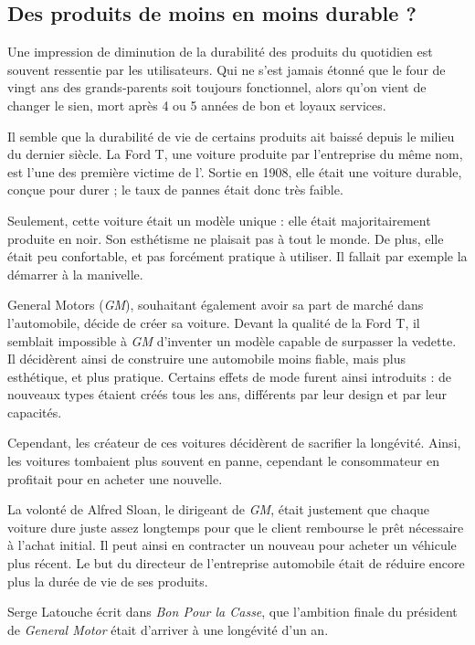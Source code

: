 \subsection{Des produits de moins en moins durable ?}

Une impression de diminution de la durabilité des produits du quotidien est souvent ressentie par les utilisateurs. Qui ne s'est jamais étonné que le four de vingt ans des grands-parents soit toujours fonctionnel, alors qu'on vient de changer le sien, mort après 4 ou 5 années de bon et loyaux services. 

Il semble que la durabilité de vie de certains produits ait baissé depuis le milieu du dernier siècle. 
\smallbreak
La Ford T, une voiture produite par l'entreprise du même nom, est l'une des première victime de l'\op. Sortie en 1908, elle était une voiture durable, conçue pour durer ; le taux de pannes était donc très faible.   


Seulement, cette voiture était un modèle unique : elle était majoritairement produite en noir. Son esthétisme ne plaisait pas à tout le monde. De plus, elle était peu confortable, et pas forcément pratique à utiliser. Il fallait par exemple la démarrer à la manivelle. 

General Motors (\textit{GM}), souhaitant également avoir sa part de marché dans l'automobile, décide de créer sa voiture. Devant la qualité de la Ford T, il semblait impossible à \textit{GM} d'inventer un modèle capable de surpasser la vedette. Il décidèrent ainsi de construire une automobile moins fiable, mais plus esthétique, et plus pratique. Certains effets de mode furent ainsi introduits : de nouveaux types étaient créés tous les ans, différents par leur design et par leur capacités.


Cependant, les créateur de ces voitures décidèrent de sacrifier la longévité. Ainsi, les voitures tombaient plus souvent en panne, cependant le consommateur en profitait pour en acheter une nouvelle.


La volonté de Alfred Sloan, le dirigeant de \textit{GM}, était justement que chaque voiture dure juste assez longtemps pour que le client rembourse le prêt nécessaire à l'achat initial.
Il peut ainsi en contracter un nouveau pour acheter un véhicule plus récent. Le but du directeur de l'entreprise automobile était de réduire encore plus la durée de vie de ses produits.

Serge Latouche écrit dans \textit{Bon Pour la Casse}\cite{bpc}, que l'ambition finale du président de \textit{General Motor} était d'arriver à une longévité d'un an.

